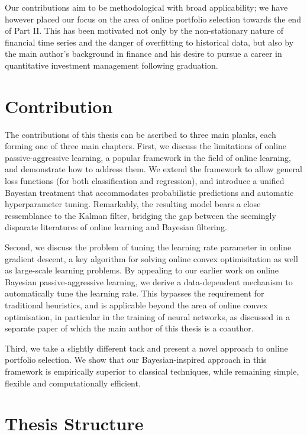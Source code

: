 Our contributions aim to be methodological with broad applicability; we have however placed our focus on the area of online portfolio selection towards the end of Part II. This has been motivated not only by the non-stationary nature of financial time series and the danger of overfitting to historical data, but also by the main author's background in finance and his desire to pursue a career in quantitative investment management following graduation.




\section{Contribution}

The contributions of this thesis can be ascribed to three main planks, each forming one of three main chapters. First, we discuss the limitations of online passive-aggressive learning, a popular framework in the field of online learning, and demonstrate how to address them. We extend the framework to allow general loss functions (for both classification and regression), and introduce a unified Bayesian treatment that accommodates probabilistic predictions and automatic hyperparameter tuning. Remarkably, the resulting model bears a close ressemblance to the Kalman filter, bridging the gap between the seemingly disparate literatures of online learning and Bayesian filtering.

Second, we discuss the problem of tuning the learning rate parameter in online gradient descent, a key algorithm for solving online convex optimisitation as well as large-scale learning problems. By appealing to our earlier work on online Bayesian passive-aggressive learning, we derive a data-dependent mechanism to automatically tune the learning rate. This bypasses the requirement for traditional heuristics, and is applicable beyond the area of online convex optimisation, in particular in the training of neural networks, as discussed in a separate paper of which the main author of this thesis is a coauthor.

Third, we take a slightly different tack and present a novel approach to online portfolio selection. We show that our Bayesian-inspired approach in this framework is empirically superior to classical techniques, while remaining simple, flexible and computationally efficient.

 

\section{Thesis Structure}

